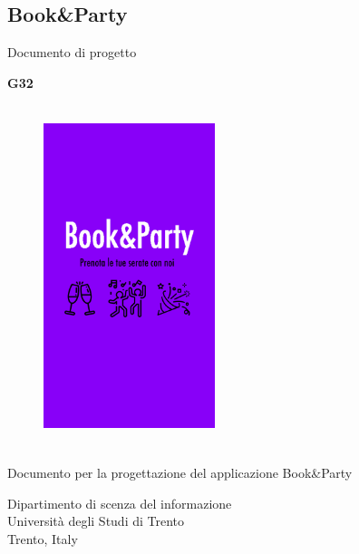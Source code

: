 \newcommand{\NameOfTheProject}{Book\&Party}

\begin{titlepage}
    \begin{center}
        \vspace*{1cm}
 
        \section*{\NameOfTheProject}
 
        \vspace{0.5cm}
        Documento di progetto
             
        \vspace{1.5cm}
 
        \textbf{G32}

        \begin{figure}[h]
            \centering
            \includegraphics[width=5cm, height=10cm]{mockup/00-logo.jpg}
            \label{fig:logo}
        \end{figure}
 
        \vfill
             
        Documento per la progettazione del applicazione \NameOfTheProject\\
             
        \vspace{0.8cm}
      
        
             
        Dipartimento di scenza del informazione\\
        Università degli Studi di Trento\\
        Trento, Italy\\
             
    \end{center}
 \end{titlepage}